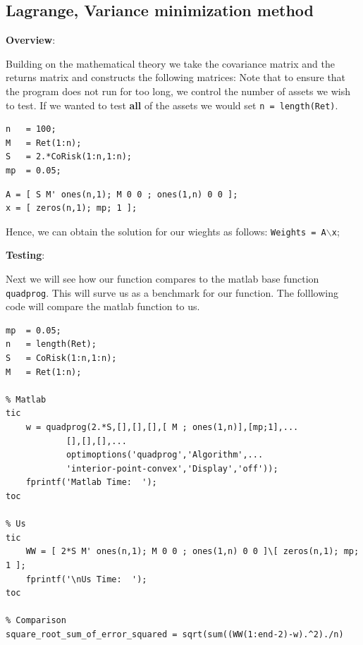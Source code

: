 \documentclass[12pt,titlepage,a4paper]{article}
\begin{document}
\subsection*{Lagrange, Variance minimization method}

\begin{par}
\textbf{Overview}:
\end{par} \vspace{1em}
\begin{par}
Building on the mathematical theory we take the covariance matrix and the returns matrix and constructs the following matrices: Note that to ensure that the program does not run for too long, we control the number of assets we wish to test. If we wanted to test \textbf{all} of the assets we would set \texttt{n = length(Ret)}.
\end{par} \vspace{1em}
\begin{verbatim}n   = 100;
M   = Ret(1:n);
S   = 2.*CoRisk(1:n,1:n);
mp  = 0.05;\end{verbatim}
\begin{verbatim}A = [ S M' ones(n,1); M 0 0 ; ones(1,n) 0 0 ];
x = [ zeros(n,1); mp; 1 ];\end{verbatim}
\begin{par}
Hence, we can obtain the solution for our wieghts as follows: \texttt{Weights = A\ensuremath{\backslash}x};
\end{par} \vspace{1em}
\begin{par}
\textbf{Testing}:
\end{par} \vspace{1em}
\begin{par}
Next we will see how our function compares to the matlab base function \texttt{quadprog}. This will surve us as a benchmark for our function. The folllowing code will compare the matlab function to us.
\end{par} \vspace{1em}
\begin{verbatim}
mp  = 0.05;
n   = length(Ret);
S   = CoRisk(1:n,1:n);
M   = Ret(1:n);

% Matlab
tic
    w = quadprog(2.*S,[],[],[],[ M ; ones(1,n)],[mp;1],...
            [],[],[],...
            optimoptions('quadprog','Algorithm',...
            'interior-point-convex','Display','off'));
    fprintf('Matlab Time:  ');
toc

% Us
tic
    WW = [ 2*S M' ones(n,1); M 0 0 ; ones(1,n) 0 0 ]\[ zeros(n,1); mp; 1 ];
    fprintf('\nUs Time:  ');
toc

% Comparison
square_root_sum_of_error_squared = sqrt(sum((WW(1:end-2)-w).^2)./n)
\end{verbatim}
\end{document}
